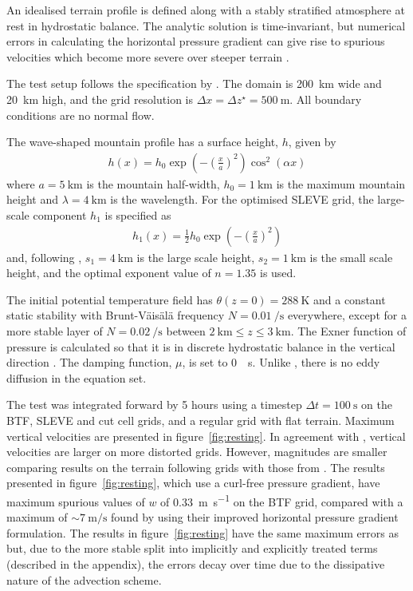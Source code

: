 \documentclass{ametsoc}
\begin{document}
An idealised terrain profile is defined along with a stably stratified atmosphere at rest in hydrostatic balance.  The analytic solution is time-invariant, but numerical errors in calculating the horizontal pressure gradient can give rise to spurious velocities which become more severe over steeper terrain \citep{klemp2011}.

The test setup follows the specification by \cite{klemp2011}.  The domain is \SI{200}{\kilo\meter} wide and \SI{20}{\kilo\meter} high, and the grid resolution is \(\Delta x = \Delta z^\star = \SI{500}{\meter}\).  All boundary conditions are no normal flow.

The wave-shaped mountain profile has a surface height, $h$, given by
\begin{align}
	h(x) = h_0 \exp \left( - \left( \frac{x}{a} \right)^2 \right) \cos^2 \left( \alpha x \right) \label{eqn:resting:mountain}
\end{align}
where $a = \SI{5}{\kilo\meter}$ is the mountain half-width, $h_0 = \SI{1}{\kilo\meter}$ is the maximum mountain height and $\lambda = \SI{4}{\kilo\meter}$ is the wavelength.  For the optimised SLEVE grid, the large-scale component $h_1$ is specified as
\begin{align}
h_1(x) = \frac{1}{2} h_0 \exp \left( - \left( \frac{x}{a} \right)^2 \right)
\end{align}
and, following \cite{leuenberger2010}, $s_1 = \SI{4}{\kilo\meter}$ is the large scale height, $s_2 = \SI{1}{\kilo\meter}$ is the small scale height, and the optimal exponent value of $n = 1.35$ is used.

The initial potential temperature field has $\theta(z = 0) = \SI{288}{\kelvin}$ and a constant static stability with Brunt-V\"ais\"al\"a frequency $N = \SI{0.01}{\per\second}$ everywhere, except for a more stable layer of $N = \SI{0.02}{\per\second}$ between $\SI{2}{\kilo\meter} \leq z \leq \SI{3}{\kilo\meter}$.  The Exner function of pressure is calculated so that it is in discrete hydrostatic balance in the vertical direction \citep{weller-shahrokhi2014}.  The damping function, \(\mu\), is set to \SI{0}{\per\second}.  Unlike \citet{klemp2011}, there is no eddy diffusion in the equation set.

The test was integrated forward by 5 hours using a timestep $\Delta t = \SI{100}{\second}$ on the BTF, SLEVE and cut cell grids, and a regular grid with flat terrain.  Maximum vertical velocities are presented in figure~\ref{fig:resting}.  In agreement with \citet{klemp2011}, vertical velocities are larger on more distorted grids.  However, magnitudes are smaller comparing results on the terrain following grids with those from \citet{klemp2011}.  
The results presented in figure~\ref{fig:resting}, which use a curl-free pressure gradient, have maximum spurious values of $w$ of \SI{0.33}{\meter\per\second} on the BTF grid, compared with a maximum of \(\sim \SI{7}{\meter\per\second}\) found by \citet{klemp2011} using their improved horizontal pressure gradient formulation.
The results in figure~\ref{fig:resting} have the same maximum errors as \citet{weller-shahrokhi2014} but, due to the more stable split into implicitly and explicitly treated terms (described in the appendix), the errors decay over time due to the dissipative nature of the advection scheme.
\end{document}
